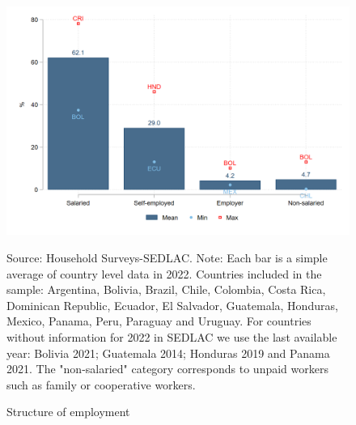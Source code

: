 \documentclass[english]{article}
\begin{document}
\begin{itemize}
            \begin{figure}[H]
                \justifying
                \caption{Structure of employment}     \centerline{\includegraphics[scale=.3]{latex/figures/Snapshot/Structure of employment.png}
                \label{fig:employment}}
                \footnotesize{Source: Household Surveys-SEDLAC.}
                \footnotesize{Note: Each bar is a simple average of country level data in 2022. Countries included in the sample: Argentina, Bolivia, Brazil, Chile, Colombia, Costa Rica, Dominican Republic, Ecuador, El Salvador, Guatemala, Honduras, Mexico, Panama, Peru, Paraguay and Uruguay. For countries without information for 2022 in SEDLAC we use the last available year: Bolivia 2021; Guatemala 2014; Honduras 2019 and Panama 2021. The "non-salaried" category corresponds to unpaid workers such as family or cooperative workers.}
            \end{figure}
    

\end{itemize}
\end{document}
